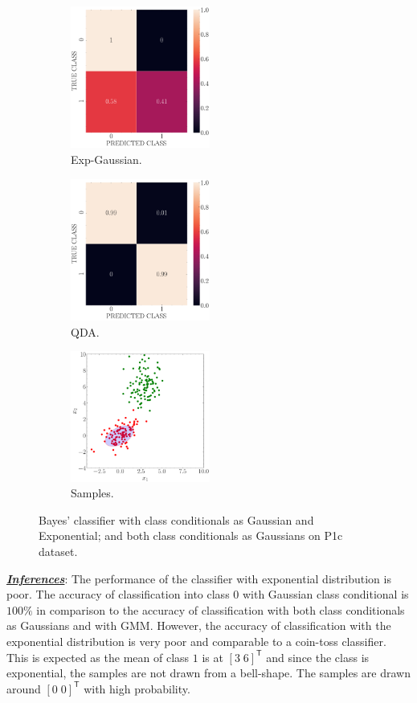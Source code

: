 \documentclass[12pt, a4 paper]{article}
\newcommand{\TT}{\mathsf{T}}
\begin{document}
\begin{figure}[!htbp]
\centering
    \begin{subfigure}[!htbp]{0.24\textwidth}
       \centering
       \includegraphics[width=1.8in]{../results/ex1/conf_mtx_QD_EXP_ML_dataset_P1c_size_199.pdf}
       \caption{Exp-Gaussian.}
       \label{fig:EXP_P1c}
    \end{subfigure}
\quad \quad
    \begin{subfigure}[!htbp]{0.24\textwidth}
       \centering
       \includegraphics[width=1.8in]{../results/ex1/conf_mtx_QD_ML_dataset_P1c_size_199.pdf}
       \caption{QDA.}
       \label{fig:QDA_EXP_P1c}
    \end{subfigure}
\quad \quad
    \begin{subfigure}[!htbp]{0.24\textwidth}
       \centering
       \includegraphics[width=1.8in]{../results/ex1/samples_QD_EXP_ML_dataset_P1c_size_199.pdf}
       \caption{Samples.}
       \label{fig:samples_P1c}
    \end{subfigure}
\caption{Bayes' classifier with class conditionals as Gaussian and Exponential; and both class conditionals as Gaussians on P1c dataset.}
\label{fig:ex13P1c}
\end{figure}
\underline {\it \bfseries Inferences}: The performance of the classifier with exponential distribution is poor. The accuracy of classification into class $0$ with Gaussian class conditional is $100\%$ in comparison to the accuracy of classification with both class conditionals as Gaussians and with GMM. However, the accuracy of classification with the exponential distribution is very poor and comparable to a coin-toss classifier. This is expected as the mean of class $1$ is at $[3\; 6]^{\TT}$ and since the class is exponential, the samples are not drawn from a bell-shape. The samples are drawn around $[0\; 0]^{\TT}$ with high probability. \\
\end{document}
